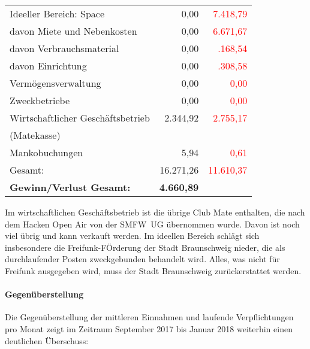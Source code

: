 \documentclass{s0minutes}
\begin{document}
\begin{longtable}{lr>{\textcolor{red}\bgroup}r<{\egroup}}
  \midrule
  Ideeller Bereich: Space           &        0{,}00 &   7{.}418{,}79 \\
  \quad davon Miete und Nebenkosten &        0{,}00 &   6{.}671{,}67 \\
  \quad davon Verbrauchsmaterial    &        0{,}00 &    {.}168{,}54 \\
  \quad davon Einrichtung           &        0{,}00 &    {.}308{,}58 \\
  \midrule
  Vermögensverwaltung               &        0{,}00 &         0{,}00 \\
  \midrule
  Zweckbetriebe                     &        0{,}00 &         0{,}00 \\
  \midrule
  Wirtschaftlicher Geschäftsbetrieb &  2{.}344{,}92 &   2{.}755{,}17 \\
  \quad (Matekasse) && \\
  \midrule
  Mankobuchungen                    &        5{,}94 &         0{,}61 \\
  \midrule\midrule
  Gesamt:                           & 16{.}271{,}26 &  11{.}610{,}37 \\

  \textbf{Gewinn/Verlust Gesamt:} & \textbf{4{.}660{,}89} &          \\
\end{longtable}

Im wirtschaftlichen Geschäftsbetrieb ist die übrige Club Mate enthalten, die
nach dem Hacken Open Air von der SMFW~UG übernommen wurde. Davon ist noch viel
übrig und kann verkauft werden. Im ideellen Bereich schlägt sich insbesondere
die Freifunk-FÖrderung der Stadt Braunschweig nieder, die als durchlaufender
Posten zweckgebunden behandelt wird. Alles, was nicht für Freifunk ausgegeben
wird, muss der Stadt Braunschweig zurückerstattet werden.

\paragraph{Gegenüberstellung}
Die Gegenüberstellung der mittleren Einnahmen und laufende Verpflichtungen pro
Monat zeigt im Zeitraum September 2017 bis Januar 2018 weiterhin einen
deutlichen Überschuss:
\end{document}

